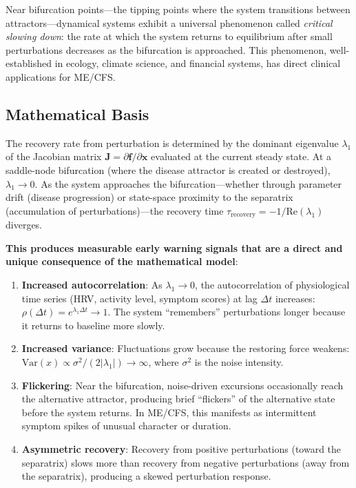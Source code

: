 Near bifurcation points---the tipping points where the system transitions between attractors---dynamical systems exhibit a universal phenomenon called \emph{critical slowing down}: the rate at which the system returns to equilibrium after small perturbations decreases as the bifurcation is approached. This phenomenon, well-established in ecology, climate science, and financial systems, has direct clinical applications for ME/CFS.

\subsection{Mathematical Basis}

The recovery rate from perturbation is determined by the dominant eigenvalue $\lambda_1$ of the Jacobian matrix $\mathbf{J} = \partial\mathbf{f}/\partial\mathbf{x}$ evaluated at the current steady state. At a saddle-node bifurcation (where the disease attractor is created or destroyed), $\lambda_1 \to 0$. As the system approaches the bifurcation---whether through parameter drift (disease progression) or state-space proximity to the separatrix (accumulation of perturbations)---the recovery time $\tau_{\text{recovery}} = -1/\text{Re}(\lambda_1)$ diverges.

\textbf{This produces measurable early warning signals that are a direct and unique consequence of the mathematical model}:

\begin{enumerate}
    \item \textbf{Increased autocorrelation}: As $\lambda_1 \to 0$, the autocorrelation of physiological time series (HRV, activity level, symptom scores) at lag $\Delta t$ increases: $\rho(\Delta t) = e^{\lambda_1 \Delta t} \to 1$. The system ``remembers'' perturbations longer because it returns to baseline more slowly.
    \item \textbf{Increased variance}: Fluctuations grow because the restoring force weakens: $\text{Var}(x) \propto \sigma^2 / (2|\lambda_1|) \to \infty$, where $\sigma^2$ is the noise intensity.
    \item \textbf{Flickering}: Near the bifurcation, noise-driven excursions occasionally reach the alternative attractor, producing brief ``flickers'' of the alternative state before the system returns. In ME/CFS, this manifests as intermittent symptom spikes of unusual character or duration.
    \item \textbf{Asymmetric recovery}: Recovery from positive perturbations (toward the separatrix) slows more than recovery from negative perturbations (away from the separatrix), producing a skewed perturbation response.
\end{enumerate}

